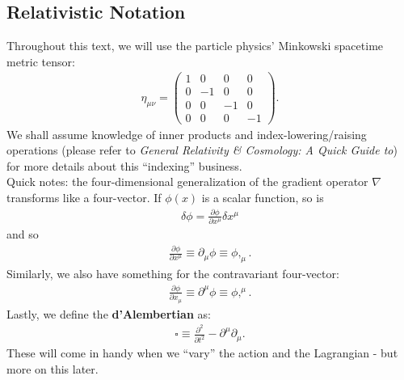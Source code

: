 \documentclass[a4paper,11pt]{article}
\numberwithin{equation}{section}
\theoremstyle{definition}
\newcommand{\p}{\partial}
\begin{document}
\subsection{Relativistic Notation}
Throughout this text, we will use the particle physics' Minkowski spacetime metric tensor:
\begin{align}
\eta_{\mu\nu} = \begin{pmatrix}
1&0&0&0\\
0&-1&0&0\\
0&0&-1&0\\
0&0&0&-1
\end{pmatrix}.
\end{align}
We shall assume knowledge of inner products and index-lowering/raising operations (please refer to \textit{General Relativity \& Cosmology: A Quick Guide to}) for more details about this ``indexing'' business. \\

Quick notes: the four-dimensional generalization of the gradient operator $\nabla$ transforms like a four-vector. If $\phi(x)$ is a scalar function, so is
\begin{align}
\delta \phi = \frac{\p \phi}{\p x^\mu}\delta x^\mu
\end{align}
and so
\begin{align}
\frac{\p \phi}{\p x^\mu} \equiv \p_\mu \phi \equiv \phi,_\mu.
\end{align}
Similarly, we also have something for the contravariant four-vector:
\begin{align}
\frac{\p \phi}{\p x_\mu} \equiv \p^\mu \phi \equiv \phi,^\mu.
\end{align}
Lastly, we define the \textbf{d'Alembertian} as:
\begin{align}
\square \equiv \frac{\p^2}{\p t^2} - \p^\mu \p_\mu.
\end{align}
These will come in handy when we ``vary'' the action and the Lagrangian - but more on this later. 
\end{document}
